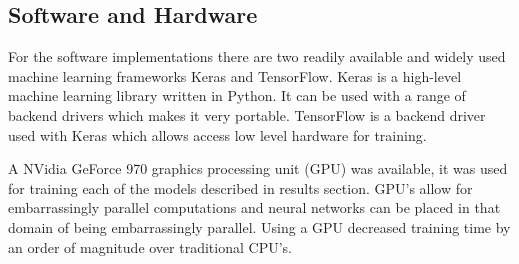 \subsection{Software and Hardware}\label{hard-soft-ware}
For the software implementations there are two readily available and widely used machine learning frameworks Keras and TensorFlow. Keras is a high-level machine learning library written in Python. It can be used with a range of backend drivers which makes it very portable. TensorFlow is a backend driver used with Keras which allows access low level hardware for training.

A NVidia GeForce 970 graphics processing unit (GPU) was available, it was used for training each of the models described in results section. GPU's allow for embarrassingly parallel computations and neural networks can be placed in that domain of being embarrassingly parallel. Using a GPU decreased training time by an order of magnitude over traditional CPU's.
